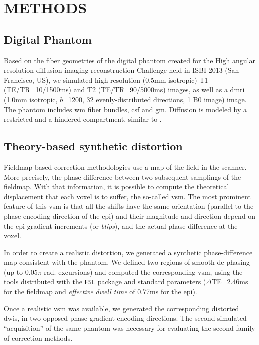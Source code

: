\section{METHODS}

\subsection{Digital Phantom}
Based on the fiber geometries of the digital phantom 
created for the High angular resolution diffusion imaging 
reconstruction Challenge held in ISBI 2013 
(San Francisco, US), we simulated high resolution 
(0.5mm isotropic) T1 (TE/TR=10/1500ms) and T2 
(TE/TR=90/5000ms) images, as well as a \gls*{dmri}
(1.0mm isotropic, $b$=1200, 32 evenly-distributed 
directions, 1 B0 image) image.
The phantom includes \gls*{wm} fiber bundles, 
\gls*{csf} and \gls*{gm}. Diffusion is modeled by a 
restricted and a hindered compartment, similar to
\cite{assaf_composite_2005}.

\subsection{Theory-based synthetic distortion}

Fieldmap-based correction methodologies
\cite{jezzard_correction_1995} use a map
of the field in the scanner. More precisely, the
phase difference between two subsequent samplings
of the fieldmap. With that information, it is possible
to compute the theoretical displacement that each
voxel is to suffer, the so-called \gls*{vsm}. The
most prominent feature of this \gls*{vsm} is that all
the shifts have the same orientation (parallel to the
phase-encoding direction of the \gls*{epi}) and their
magnitude and direction depend on the \gls*{epi} 
gradient increments (or \emph{blips}), and the actual
phase difference at the voxel.

In order to create a realistic distortion, we
generated a synthetic phase-difference map 
consistent with the phantom.  We defined two regions 
of smooth de-phasing (up to $0.05\pi$ rad. excursions) 
and computed the corresponding \gls*{vsm}, using the 
tools distributed with the \texttt{FSL} package 
\cite{jenkinson_fsl_2012}  and
standard parameters ($\Delta$TE=2.46ms for the
fieldmap and \emph{effective dwell time} of 
0.77ms for the \gls*{epi}).

Once a realistic \gls*{vsm} was available, we generated
the corresponding distorted \glspl*{dwi}, in two opposed
phase-gradient encoding directions. The second simulated
``acquisition'' of the same phantom was necessary 
for evaluating the second family of correction methods.

